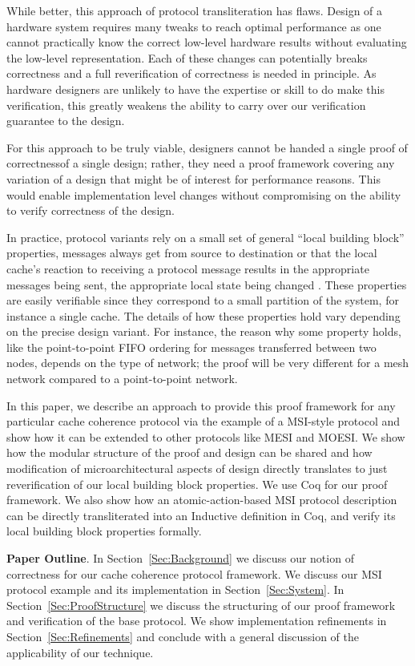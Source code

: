 While better, this approach of protocol transliteration has
flaws. Design of a hardware system requires many tweaks to reach
optimal performance as one cannot practically know the correct
low-level hardware results without evaluating the low-level
representation.  Each of these changes can potentially breaks
correctness and a full reverification of correctness is needed in
principle. As hardware designers are unlikely to have the expertise or
skill to do make this verification, this greatly weakens the ability
to carry over our verification guarantee to the design.

For this approach to be truly viable, designers cannot be handed a
single proof of correctnessof a single design; rather, they need a
proof framework covering any variation of a design that might be of
interest for performance reasons. This would enable implementation
level changes without compromising on the ability to verify
correctness of the design.

In practice, protocol variants rely on a small set of general ``local
building block'' properties, \eg{} messages always get from source to
destination or that the local cache's reaction to receiving a protocol
message results in the appropriate messages being sent, the
appropriate local state being changed \etc{}.  These properties are
easily verifiable since they correspond to a small partition of the
system, for instance a single cache.  The details of how these
properties hold vary depending on the precise design variant. For
instance, the reason why some property holds, like the point-to-point
FIFO ordering for messages transferred between two nodes, depends on
the type of network; the proof will be very different for a mesh
network compared to a point-to-point network.

In this paper, we describe an approach to provide this proof framework
for any particular cache coherence protocol via the example of a
MSI-style protocol and show how it can be extended to other protocols
like MESI and MOESI. We show how the modular structure of the proof
and design can be shared and how modification of microarchitectural
aspects of design directly translates to just reverification of our
local building block properties. We use Coq for our proof
framework. We also show how an atomic-action-based MSI protocol
description can be directly transliterated into an Inductive
definition in Coq, and verify its local building block properties
formally.

\noindent\textbf{Paper Outline}. In Section~\ref{Sec:Background} we
discuss our notion of correctness for our cache coherence protocol
framework. We discuss our MSI protocol example and its implementation
in Section~\ref{Sec:System}. In Section~\ref{Sec:ProofStructure} we discuss
the structuring of our proof framework and verification of the base
protocol. We show implementation refinements in
Section~\ref{Sec:Refinements} and conclude with a general discussion
of the applicability of our technique.
